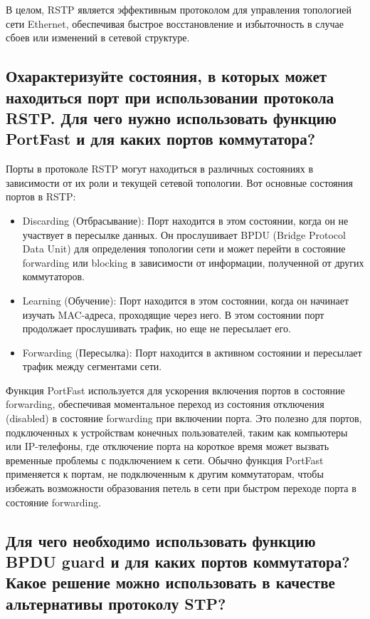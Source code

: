 В целом, RSTP является эффективным протоколом для управления
топологией сети Ethernet, обеспечивая быстрое восстановление и
избыточность в случае сбоев или изменений в сетевой структуре.

\subsection{Охарактеризуйте состояния, в которых может находиться порт при
использовании протокола RSTP. Для чего нужно использовать
функцию PortFast и для каких портов коммутатора?}

Порты в протоколе RSTP могут находиться в различных состояниях в
зависимости от их роли и текущей сетевой топологии. Вот основные
состояния портов в RSTP:

\begin{itemize}
    \item Discarding (Отбрасывание): Порт находится в этом состоянии, когда
    он не участвует в пересылке данных. Он прослушивает BPDU
    (Bridge Protocol Data Unit) для определения топологии сети и может
    перейти в состояние forwarding или blocking в зависимости от
    информации, полученной от других коммутаторов.
    \item Learning (Обучение): Порт находится в этом состоянии, когда он
    начинает изучать MAC-адреса, проходящие через него. В этом
    состоянии порт продолжает прослушивать трафик, но еще не
    пересылает его.
    \item Forwarding (Пересылка): Порт находится в активном состоянии и
    пересылает трафик между сегментами сети.
\end{itemize}

Функция PortFast используется для ускорения включения портов в
состояние forwarding, обеспечивая моментальное переход из состояния
отключения (disabled) в состояние forwarding при включении порта. Это
полезно для портов, подключенных к устройствам конечных
пользователей, таким как компьютеры или IP-телефоны, где отключение
порта на короткое время может вызвать временные проблемы с
подключением к сети. Обычно функция PortFast применяется к портам, не
подключенным к другим коммутаторам, чтобы избежать возможности
образования петель в сети при быстром переходе порта в состояние
forwarding.


\subsection{Для чего необходимо использовать функцию BPDU guard и для каких
портов коммутатора? Какое решение можно использовать в качестве
альтернативы протоколу STP?}

